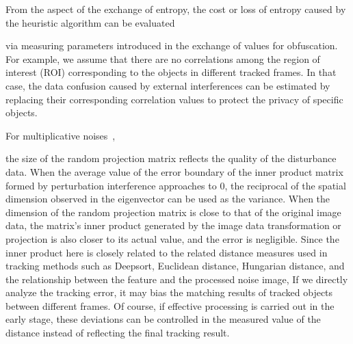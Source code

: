 \documentclass[trans]{IEEEtran}
\newcommand{\el}[1]{{\color{black}#1}}
\begin{document}
From the aspect of the exchange of entropy, the cost or loss of entropy caused by the heuristic algorithm can be evaluated \el{ via measuring parameters introduced in the exchange of values for obfuscation. For example, we assume that there are no correlations among the region of interest (ROI) corresponding to the objects in different tracked frames. In that case, the data confusion caused by external interferences can be estimated by replacing their corresponding correlation values to protect the privacy of specific objects.

For multiplicative noises~\cite{liu2006random},} the size of the random projection matrix reflects the quality of the disturbance data. 
\el{ When the average value of the error boundary of the inner product matrix formed by perturbation interference approaches to 0, the reciprocal of the spatial dimension observed in the eigenvector can be used as the variance. When the dimension of the random projection matrix is close to that of the original image data, the matrix's inner product generated by the image data transformation or projection is also closer to its actual value, and the error is negligible.
Since the inner product here is closely related to the related distance measures used in tracking methods such as Deepsort, Euclidean distance, Hungarian distance, and the relationship between the feature and the processed noise image, If we directly analyze the tracking error, it may bias the matching results of tracked objects between different frames. Of course, if effective processing is carried out in the early stage, these deviations can be controlled in the measured value of the distance instead of reflecting the final tracking result.}

%
\end{document}
